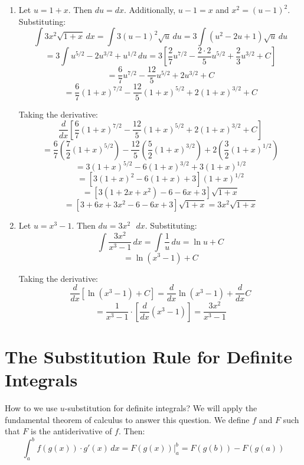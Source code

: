 \begin{Answer}[ref = u_indef]
\begin{enumerate}
    \item Let $u = 1 + x$. Then $du = dx$. Additionally, $u - 1 = x$ and $x^2 
    = \left( u - 1 \right)^2$. Substituting:
    $$\int 3x^2 \sqrt{1 + x}\,dx = \int 3 \left(u - 1 \right)^2 \sqrt{u}\,du = 
    3 \int \left( u^2 - 2u + 1 \right) \sqrt{u}\,du$$
    $$= 3 \int u^{5/2} - 2u^{3/2} + u^{1/2}\,du = 3 \left[ \frac{2}{7}u^{7/2} 
    - \frac{2 \cdot 2}{5}u^{5/2} + \frac{2}{3}u^{3/2} + C \right]$$
    $$= \frac{6}{7}u^{7/2} - \frac{12}{5}u^{5/2} + 2u^{3/2} + C$$
    $$= \frac{6}{7} \left( 1 + x \right)^{7/2} - \frac{12}{5} \left( 1 + x 
    \right)^{5/2} + 2 \left( 1 + x \right)^{3/2} + C$$

    Taking the derivative:
    $$\frac{d}{dx} \left[ \frac{6}{7} \left( 1 + x \right)^{7/2} - 
    \frac{12}{5} \left( 1 + x \right)^{5/2} + 2 \left( 1 + x \right)^{3/2} + C 
    \right]$$
    $$= \frac{6}{7} \left( \frac{7}{2} \left( 1 + x \right)^{5/2} \right) - 
    \frac{12}{5} \left( \frac{5}{2} \left( 1 + x \right)^{3/2} \right) + 2 
    \left( \frac{3}{2} \left( 1 + x \right)^{1/2} \right)$$
    $$= 3 \left( 1 + x \right)^{5/2} - 6 \left( 1 + x \right)^{3/2} + 3 \left( 
    1 + x \right)^{1/2}$$
    $$= \left[ 3 \left( 1 + x \right)^2 - 6 \left( 1 + x \right) + 3 \right] 
    \left( 1 + x \right)^{1/2}$$
    $$= \left[ 3 \left( 1 + 2x + x^2 \right) - 6 - 6x + 3 \right] \sqrt{1 + x}$$
    $$= \left[ 3 + 6x + 3x^2 - 6 - 6x + 3 \right] \sqrt{1 + x} = 3x^2 
    \sqrt{1 + x}$$

    \item Let $u = x^3 - 1$. Then $du = 3x^2 \text{ } dx$. Substituting:
    $$\int \frac{3x^2}{x^3 - 1}\,dx = \int \frac{1}{u}\,du = \ln{u} + C$$
    $$= \ln{ \left( x^3 - 1 \right)} + C$$

    Taking the derivative:
    $$\frac{d}{dx} \left[ \ln{ \left( x^3 - 1 \right)} + C \right] = 
    \frac{d}{dx} \ln{ \left( x^3 - 1 \right)} + \frac{d}{dx}C$$
    $$= \frac{1}{x^3 -1} \cdot \left[ \frac{d}{dx} \left( x^3 - 1 \right) 
    \right] = \frac{3x^2}{x^3 - 1}$$
    
\end{enumerate}
\end{Answer}

\section{The Substitution Rule for Definite Integrals}
How to we use $u$-substitution for definite integrals? We will apply the 
fundamental theorem of calculus to answer this question. We define $f$ and $F$ 
such that $F$ is the antiderivative of $f$. Then:
$$\int_a^b f(g(x)) \cdot g'(x)\,dx = F(g(x))|_{a}^{b} = F(g(b)) - F(g(a))$$

